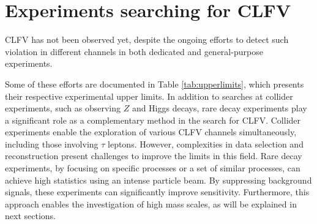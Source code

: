 \section{Experiments searching for CLFV}
CLFV has not been observed yet, despite the ongoing efforts to 
detect such violation in different channels in both dedicated and general-purpose experiments.

Some of these efforts are documented in Table \ref{tab:upperlimits}, which 
presents their respective experimental upper limits. 
In addition to searches at collider experiments, such as observing $Z$ and 
Higgs decays, rare decay experiments play a significant role as a complementary method in the search for CLFV. 
Collider experiments enable the exploration of various CLFV channels simultaneously, 
including those involving $\tau$ leptons. 
However, complexities in data selection and reconstruction 
present challenges to improve the limits in this field.
Rare decay experiments, by focusing on specific processes or a 
set of similar processes, can achieve high statistics using an intense particle beam. 
By suppressing background signals, these experiments can 
significantly improve sensitivity. Furthermore, this approach 
enables the investigation of high mass scales, as will be explained in next sections.

